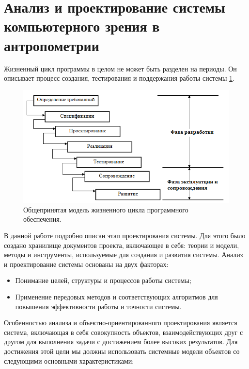 \section{Анализ и проектирование системы компьютерного зрения в антропометрии}
Жизненный цикл программы в целом не может быть разделен на периоды. Он описывает процесс создания, тестирования и поддержания работы системы \ref{img33}.

\begin{figure}[ht!]
\centering
\includegraphics [scale=1] {images/h33.png}
\begin{center}
\caption{Общепринятая модель жизненного цикла программного обеспечения.} \label{img33}
\end{center}
\end{figure}

В данной работе подробно описан этап проектирования системы. Для этого было создано хранилище документов проекта, включающее в себя: теории и модели, методы и инструменты, используемые для создания и развития системы. Анализ и проектирование системы основаны на двух факторах: 

\begin{itemize}
	\item Понимание целей, структуры и процессов работы системы;
  \item Применение передовых методов и соответствующих алгоритмов для повышения эффективности работы и точности системы.

\end{itemize}
Особенностью анализа и объектно-ориентированного проектирования является система, включающая в себя совокупность объектов, взаимодействующих друг с другом для выполнения задачи с  достижением более высоких результатов. Для достижения этой цели мы должны использовать системные модели объектов со следующими основными характеристиками:

